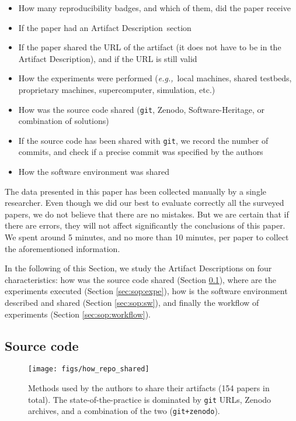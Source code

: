 \documentclass[sigconf,natbib=false]{acmart}
\newcommand{\eg}{\emph{e.g.,}}
\newcommand{\ad}{Artifact Description}
\begin{document}
\begin{itemize}
  \item How many reproducibility badges, and which of them, did the paper receive
  \item If the paper had an \ad\ section
  \item If the paper shared the URL of the artifact (it does not have to be in the \ad), and if the URL is still valid
  \item How the experiments were performed (\eg\ local machines, shared testbeds, proprietary machines, supercomputer, simulation, etc.)
  \item How was the source code shared (\texttt{git}, Zenodo, Software-Heritage, or combination of solutions)
  \item If the source code has been shared with \texttt{git}, we record the number of commits, and check if a precise commit was specified by the authors
  \item How the software environment was shared
\end{itemize}

The data presented in this paper has been collected manually by a single researcher.
Even though we did our best to evaluate correctly all the surveyed papers, we do not believe that there are no mistakes.
But we are certain that if there are errors, they will not affect significantly the conclusions of this paper.
We spent around 5 minutes, and no more than 10 minutes, per paper to collect the aforementioned information.


In the following of this Section, we study the \ad s on four characteristics: how was the source code shared (Section \ref{sec:sop:src}), where are the experiments executed (Section \ref{sec:sop:expe}), how is the software environment described and shared (Section \ref{sec:sop:sw}), and finally the workflow of experiments (Section \ref{sec:sop:workflow}).

\subsection{Source code}\label{sec:sop:src}

\begin{figure}
  \centering
  \texttt{[image: figs/how\_repo\_shared]}
  \caption{Methods used by the authors to share their artifacts (154 papers in total). The state-of-the-practice is dominated by \texttt{git} URLs, Zenodo archives, and a combination of the two (\texttt{git+zenodo}).}\label{fig:how_repo_shared}
\end{figure}
\end{document}
